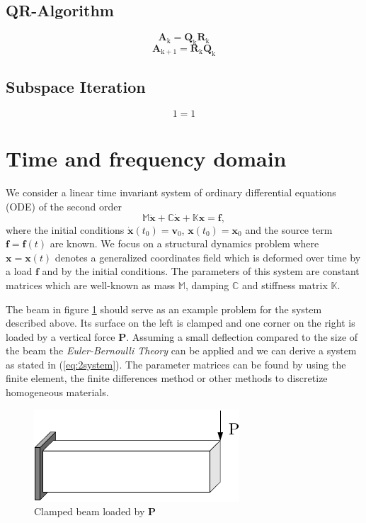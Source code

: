 \documentclass[conference]{journal}%
\newcommand{\bb}[1]{\mathbb{#1}}
\newcommand{\B}[1]{\mathbf{#1}}
\newcommand{\Bx}{\B{x}}
\newcommand{\M}{\bb{M}}
\newcommand{\C}{\bb{C}}
\newcommand{\K}{\bb{K}}
\begin{document}
	\subsection*{QR-Algorithm}
	\begin{equation}
	\textbf{A}_\mathrm{k}={\textbf{Q}_\mathrm{k}}{\textbf{R}_\mathrm{k}}
	\end{equation}
	\begin{equation}
	\textbf{A}_\mathrm{k+1}={\textbf{R}_\mathrm{k}}{\textbf{Q}_\mathrm{k}}
	\end{equation}
	\subsection*{Subspace Iteration}
	\begin{equation}
	1=1
	\end{equation}
	
	
	
	
	
	
	\section{Time and frequency domain}
	We consider a linear time invariant system of ordinary differential equations (ODE) of the second order
	\begin{equation} \label{eq:2system}
	\M \ddot{\Bx} + \C \dot{\Bx} + \K \Bx = \B{f},
	\end{equation}
	where the initial conditions $\dot{\Bx}(t_0)=\B{v}_0$, $\Bx(t_0)=\Bx_0$ and the source term $\B{f}=\B{f}(t)$ are known. We focus on a structural dynamics problem where $\Bx=\Bx(t)$ denotes a generalized coordinates field which is deformed over time by a load $\B{f}$ and by the initial conditions. The parameters of this system are constant matrices which are well-known as mass $\M$, damping $\C$ and stiffness matrix $\K$.

	The beam in figure \ref{fig:beam} should serve as an example problem for the system described above. Its surface on the left is clamped and one corner on the right is loaded by a vertical force $\B{P}$. Assuming a small deflection compared to the size of the beam the \textit{Euler-Bernoulli Theory} can be applied and we can derive a system as stated in (\ref{eq:2system}). The parameter matrices can be found by using the finite element, the finite differences method or other methods to discretize homogeneous materials.

	\begin{figure}[h]
	\centering
	\includegraphics{./figures/beam.pdf}
	\caption{Clamped beam loaded by $\B{P}$}
	\label{fig:beam}
	\end{figure}
\end{document}
